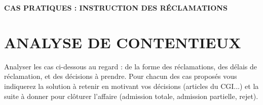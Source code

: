 \documentclass[a4paper, 12pt]{exam}
\begin{document}
	
	\begin{center}
		\Large \textbf{CAS PRATIQUES : INSTRUCTION DES RÉCLAMATIONS} \\[0.5cm]
	\end{center}
	
	\vspace{0.5cm}
	
\section*{ANALYSE DE CONTENTIEUX}

Analyser les cas ci-dessous au regard : de la forme des réclamations, des délais de réclamation, et des décisions à prendre. Pour chacun des cas proposés vous indiquerez la solution à retenir en motivant vos décisions (articles du CGI...) et la suite à donner pour clôturer l'affaire (admission totale, admission partielle, rejet).
\end{document}
